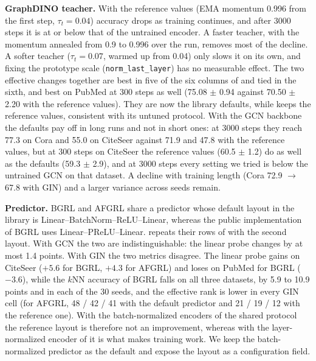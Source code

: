 \documentclass[conference]{IEEEtran}
\begin{document}
\textbf{GraphDINO teacher.} With the reference values (EMA momentum 0.996 from the first step, $\tau_t{=}0.04$) accuracy drops as training continues, and after 3000 steps it is at or below that of the untrained encoder. A faster teacher, with the momentum annealed from 0.9 to 0.996 over the run, removes most of the decline. A softer teacher ($\tau_t{=}0.07$, warmed up from 0.04) only slows it on its own, and fixing the prototype scale (\texttt{norm\_last\_layer}) has no measurable effect. The two effective changes together are best in five of the six columns of  and tied in the sixth, and best on PubMed at 300 steps as well (75.08 $\pm$ 0.94 against 70.50 $\pm$ 2.20 with the reference values). They are now the library defaults, while  keeps the reference values, consistent with its untuned protocol. With the GCN backbone the defaults pay off in long runs and not in short ones: at 3000 steps they reach 77.3 on Cora and 55.0 on CiteSeer against 71.9 and 47.8 with the reference values, but at 300 steps on CiteSeer the reference values (60.5 $\pm$ 1.2) do as well as the defaults (59.3 $\pm$ 2.9), and at 3000 steps every setting we tried is below the untrained GCN on that dataset. A decline with training length (Cora 72.9 $\rightarrow$ 67.8 with GIN) and a larger variance across seeds remain.

\textbf{Predictor.} BGRL and AFGRL share a predictor whose default layout in the library is Linear--BatchNorm--ReLU--Linear, whereas the public implementation of BGRL uses Linear--PReLU--Linear.  repeats their rows of  with the second layout. With GCN the two are indistinguishable: the linear probe changes by at most 1.4 points. With GIN the two metrics disagree. The linear probe gains on CiteSeer ($+5.6$ for BGRL, $+4.3$ for AFGRL) and loses on PubMed for BGRL ($-3.6$), while the $k$NN accuracy of BGRL falls on all three datasets, by 5.9 to 10.9 points and in each of the 30 seeds, and the effective rank is lower in every GIN cell (for AFGRL, 48 / 42 / 41 with the default predictor and 21 / 19 / 12 with the reference one). With the batch-normalized encoders of the shared protocol the reference layout is therefore not an improvement, whereas with the layer-normalized encoder of  it is what makes training work. We keep the batch-normalized predictor as the default and expose the layout as a configuration field.
\end{document}
